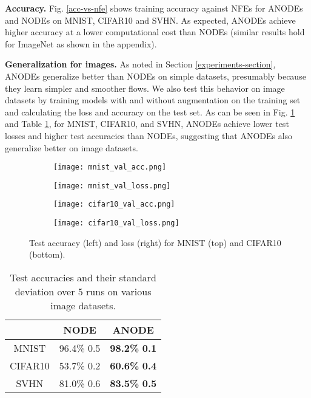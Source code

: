 \documentclass{article}
\begin{document}
\textbf{Accuracy.} Fig. \ref{acc-vs-nfe} shows training accuracy against NFEs for ANODEs and NODEs on MNIST, CIFAR10 and SVHN. As expected, ANODEs achieve higher accuracy at a lower computational cost than NODEs (similar results hold for ImageNet as shown in the appendix).

\textbf{Generalization for images.} As noted in Section \ref{experiments-section}, ANODEs generalize better than NODEs on simple datasets, presumably because they learn simpler and smoother flows. We also test this behavior on image datasets by training models with and without augmentation on the training set and calculating the loss and accuracy on the test set. As can be seen in Fig. \ref{img-generalization} and Table \ref{acc-table}, for MNIST, CIFAR10, and SVHN, ANODEs achieve lower test losses and higher test accuracies than NODEs, suggesting that ANODEs also generalize better on image datasets. 

\begin{figure}[t]
\vspace{-5pt}
\centering
\begin{subfigure}[t]{0.34\linewidth}
\centering
\texttt{[image: mnist\_val\_acc.png]}
\end{subfigure}
\begin{subfigure}[t]{0.34\linewidth}
\centering
\texttt{[image: mnist\_val\_loss.png]}
\end{subfigure}
\begin{subfigure}[t]{0.34\linewidth}
\centering
\texttt{[image: cifar10\_val\_acc.png]}
\end{subfigure}
\begin{subfigure}[t]{0.34\linewidth}
\centering
\texttt{[image: cifar10\_val\_loss.png]}
\end{subfigure}
\setlength{\abovecaptionskip}{-1pt}
\caption{Test accuracy (left) and loss (right) for MNIST (top) and CIFAR10 (bottom).}
\label{img-generalization}
\end{figure}

\begin{table}[h]
\vspace{-5pt}
\begin{center}
\begin{tabular}{c c c}
 & NODE & ANODE
\\ \hline
MNIST & 96.4\%  0.5 & \textbf{98.2\%}  \textbf{0.1} \\
CIFAR10 & 53.7\%  0.2 & \textbf{60.6\%}  \textbf{0.4} \\
SVHN & 81.0\%  0.6 & \textbf{83.5\%}  \textbf{0.5} \\
\end{tabular}
\end{center}
\setlength{\abovecaptionskip}{-0pt}
\setlength{\belowcaptionskip}{-12pt}
\caption{Test accuracies and their standard deviation over 5 runs on various image datasets.}
\label{acc-table}
\end{table}
\end{document}
